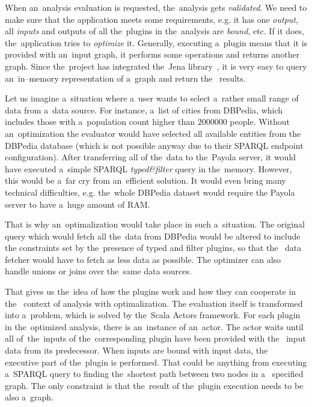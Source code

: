 When an~analysis evaluation is requested, the~analysis gets \emph{validated}. We need to make
sure that the application meets some requirements, e.g. it has one 
\emph{output}, all \emph{inputs} and outputs of all the~plugins in the~analysis are \emph{bound}, etc.
If it does, the~application tries to \emph{optimize} it. Generally, executing a~plugin 
means that it is provided with an~input graph, it performs some operations and 
returns another graph. Since the~project has integrated the~Jena library~\cite{jena}, it is 
very easy to query an~in--memory representation of a~graph and return the~
results.

Let us imagine a~situation where a~user wants to select a~rather small range of 
data from a~data source. For instance, a~list of cities from DBPedia, which includes those
with a~population count higher than $2000000$ people. Without an~optimization
the evaluator would have selected all available entities from the DBPedia 
database (which is not possible anyway due to their SPARQL endpoint 
configuration). After transferring all of the~data to the~Payola server, it would have
executed a~simple SPARQL \emph{typed\&filter} query in the~memory.
However, this would be a~far cry from an~efficient solution. It would even
bring many technical difficulties, e.g. the~whole DBPedia dataset would require 
the Payola server to have a~huge amount of RAM.

That is why an~optimalization would take place in such a~situation. The original 
query which would fetch all the~data from DBPedia would be altered to include 
the constraints set by the~presence of typed and filter plugins, so that the~
data fetcher would have to fetch as less data as possible. The optimizer can 
also handle unions or joins over the~same data sources.

That gives us the~idea of how the plugins work and how they can cooperate in the~
context of analysis with optimalization. The evaluation itself is transformed 
into a~problem, which is solved by the~Scala Actors framework. For each plugin 
in the~optimized analysis, there is an~instance of an~actor. The actor waits 
until all of~the~inputs of the~corresponding plugin have been provided with the~
input data from its predecessor. When inputs are bound with input data, the~
executive part of the~plugin is performed. That could be anything from 
executing a~SPARQL query to finding the~shortest path between two nodes in a~
specified graph. The only constraint is that the~result of the~plugin execution 
needs to be also a~graph.

